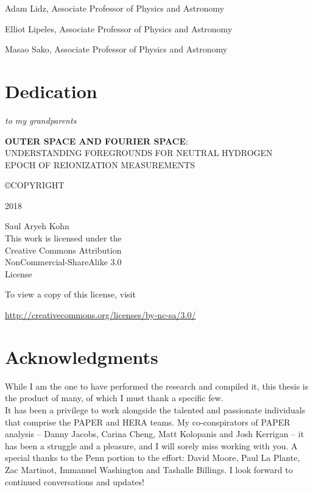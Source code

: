 \documentclass[12pt,twoside,openany]{book}
\makeatletter
\newcommand{\doublespaced}{\renewcommand{\baselinestretch}{2}\normalfont}
\newcommand{\halfspaced}{\renewcommand{\baselinestretch}{1.5}\normalfont}
\newcommand{\unchapter}[1]{%
  \begingroup
  \let\@makechapterhead\@gobble %
  \chapter{#1}
  \endgroup
}
\newcommand{\tita}{{\bf OUTER SPACE AND FOURIER SPACE}:\\UNDERSTANDING FOREGROUNDS FOR NEUTRAL HYDROGEN\\EPOCH OF REIONIZATION MEASUREMENTS}
\makeatother
\begin{document}
\noindent Adam Lidz, Associate Professor of Physics and Astronomy

\noindent Elliot Lipeles, Associate Professor of Physics and Astronomy

\noindent Masao Sako, Associate Professor of Physics and Astronomy

\newpage

\pagestyle{plain}
\unchapter{Dedication}
\doublespaced
\vspace*{2in}
\begin{center}
{\large\emph{to my grandparents}}
\end{center}

\newpage


\thispagestyle{empty} %

\vspace*{\fill}

\begin{flushleft}
{\tita }

\copyright \space COPYRIGHT
 
2018

Saul Aryeh Kohn\\[24 pt] %

This work is licensed under the \\
Creative Commons Attribution \\
NonCommercial-ShareAlike 3.0 \\
License

To view a copy of this license, visit

\url{http://creativecommons.org/licenses/by-nc-sa/3.0/}
\end{flushleft}



\chapter{Acknowledgments}

\noindent
While I am the one to have performed the research and compiled it, this thesis is the product of many, of which I must thank a specific few. \\

\noindent
It has been a privilege to work alongside the talented and passionate individuals that comprise the PAPER and HERA teams. My co-conspirators of PAPER analysis -- Danny Jacobs, Carina Cheng, Matt Kolopanis and Josh Kerrigan -- it has been a struggle and a pleasure, and I will sorely miss working with you. A special thanks to the Penn portion to the effort: David Moore, Paul La Plante, Zac Martinot, Immanuel Washington and Tashalle Billings. I look forward to continued conversations and updates!\\
\end{document}
